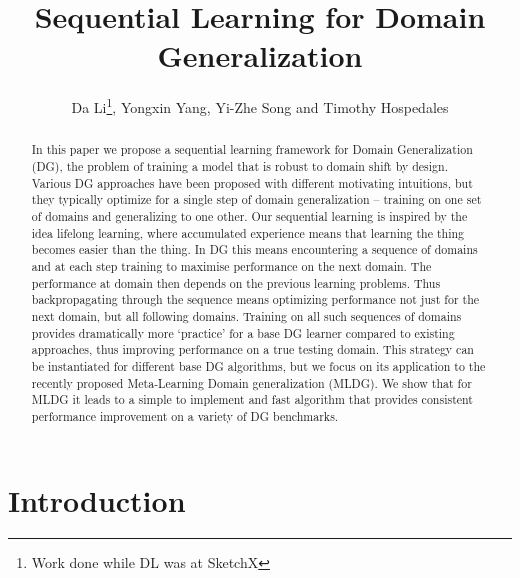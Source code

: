 \documentclass[runningheads]{llncs}
\begin{document}
\title{Sequential Learning for Domain Generalization}
\author{Da Li\thanks{Work done while DL was at SketchX}, Yongxin Yang, Yi-Zhe Song and Timothy Hospedales}
\maketitle              \begin{abstract}
In this paper we propose a sequential learning framework for Domain Generalization (DG), the problem of training a model that is robust to domain shift by design. Various DG approaches have been proposed with different motivating intuitions, but they typically optimize for a single step of domain generalization -- training on one set of domains and generalizing to one other. Our sequential learning is inspired by the idea lifelong learning, where accumulated experience means that learning the  thing becomes easier than the  thing. In DG this means encountering a sequence of domains and at each step training to maximise performance on the next domain. The performance at domain  then depends on the previous  learning problems. Thus backpropagating through the sequence means optimizing performance not just for the next domain, but all following domains. Training on all such sequences of domains provides dramatically more `practice' for a base DG learner compared to existing approaches, thus improving performance on a true testing domain. This strategy can be instantiated for different base DG algorithms, but we focus on its application to the recently proposed Meta-Learning Domain generalization (MLDG). We show that for MLDG it leads to a simple to implement and fast algorithm that provides consistent performance improvement on a variety of DG benchmarks. 

\end{abstract}
\section{Introduction}
\label{sec:introduction}
\end{document}
